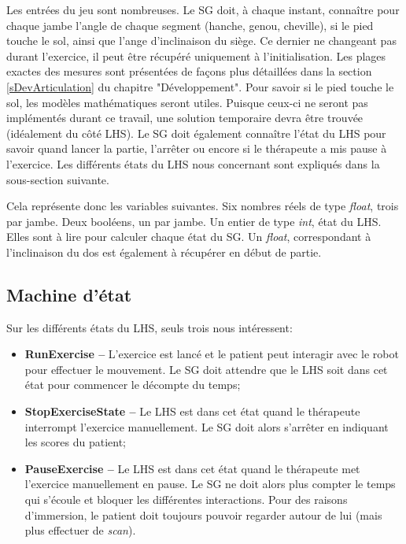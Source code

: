 		Les entrées du jeu sont nombreuses. Le SG doit, à chaque instant, connaître pour chaque jambe l'angle de chaque segment (hanche, genou, cheville), si le pied touche le sol, ainsi que l'ange d'inclinaison du siège. Ce dernier ne changeant pas durant l'exercice, il peut être récupéré uniquement à l'initialisation. Les plages exactes des mesures sont présentées de façons plus détaillées dans la section \ref{sDevArticulation} du chapitre "Développement".
		Pour savoir si le pied touche le sol, les modèles mathématiques seront utiles. Puisque ceux-ci ne seront pas implémentés durant ce travail, une solution temporaire devra être trouvée (idéalement du côté LHS).
		Le SG doit également connaître l'état du LHS pour savoir quand lancer la partie, l'arrêter ou encore si le thérapeute a mis pause à l'exercice. Les différents états du LHS nous concernant sont expliqués dans la sous-section suivante.
		
		Cela représente donc les variables suivantes. Six nombres réels de type \textit{float}, trois par jambe. Deux booléens, un par jambe. Un entier de type \textit{int}, état du LHS. Elles sont à lire pour calculer chaque état du SG. Un \textit{float}, correspondant à l'inclinaison du dos est également à récupérer en début de partie.
		
	\subsection*{Machine d'état}
		Sur les différents états du LHS, seuls trois nous intéressent:
		\begin{itemize}
			\item \textbf{RunExercise --} L'exercice est lancé et le patient peut interagir avec le robot pour effectuer le mouvement. Le SG doit attendre que le LHS soit dans cet état pour commencer le décompte du temps;
			\item \textbf{StopExerciseState --} Le LHS est dans cet état quand le thérapeute interrompt l'exercice manuellement. Le SG doit alors s'arrêter en indiquant les scores du patient;
			\item \textbf{PauseExercise --} Le LHS est dans cet état quand le thérapeute met l'exercice manuellement en pause. Le SG ne doit alors plus compter le temps qui s'écoule et bloquer les différentes interactions. Pour des raisons d'immersion, le patient doit toujours pouvoir regarder autour de lui (mais plus effectuer de \textit{scan}).
		\end{itemize}
	
